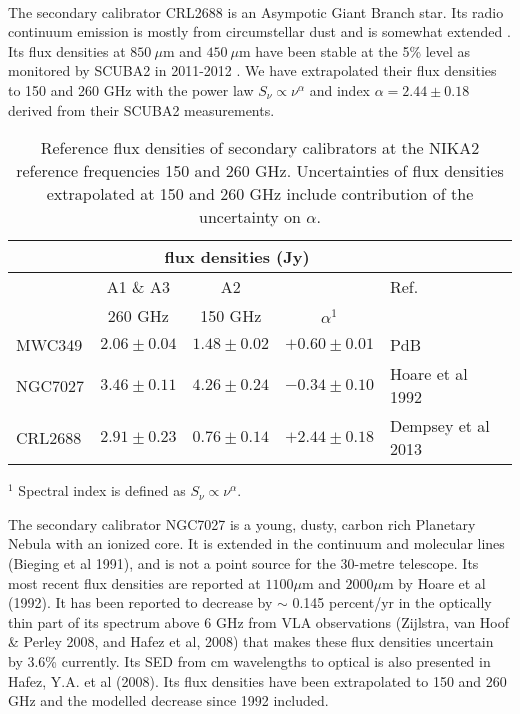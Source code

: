 \\

The secondary calibrator CRL2688 is an Asympotic Giant Branch star. Its radio continuum emission is mostly
from circumstellar dust and is somewhat extended \cite{Knapp}.
Its flux densities at $850\ \mu$m  and $450 \ \mu$m  have been stable at the 5\% level as monitored by SCUBA2 in 2011-2012 
\cite{Dempsey}. We have extrapolated their flux densities to  150 and 260 GHz
with the power law $S_{\nu} \propto \nu^{\alpha}$ and index $\alpha=2.44\pm0.18$ derived from their SCUBA2 measurements.

\begin{table}[t]
\begin{center}    
  \begin{threeparttable}

\begin{tabular}{|l|c|c|c|l|}
\hline
\multicolumn{1}{|c}{}  & \multicolumn{3}{|c}{flux  densities (Jy)} & \multicolumn{1}{|c|}{}  \\
\hline
         &    A1 \& A3       &  A2             &          &   Ref. \\
         &  260 GHz           &  150 GHz         & $\alpha^1$ &      \\
\hline
MWC349   &   $2.06\pm0.04$  &  $1.48\pm0.02$ &  $+0.60\pm0.01$      &  PdB \cite{krips}    \\
NGC7027  &   $3.46\pm0.11$   &  $4.26\pm0.24$  &  $-0.34\pm0.10$     &  Hoare et al 1992 \cite{Hoare}      \\
CRL2688  &   $2.91\pm0.23$   &  $0.76\pm0.14$  &  $+2.44\pm0.18$     &  Dempsey et al 2013  \cite{Dempsey} \\
\hline
\end{tabular}
  \begin{tablenotes}
{\small     
  \item[$^1$]  Spectral index is defined as $S_{\nu} \propto \nu^{\alpha}$. 
}
  \end{tablenotes}
\end{threeparttable}
\caption[]{Reference flux densities of secondary calibrators at the NIKA2 reference frequencies 150 and 260 GHz. Uncertainties of flux densities extrapolated
at 150 and 260 GHz include contribution of the uncertainty on $\alpha$.}
\label{tab:flux_ref_sec}
\end{center}
\end{table}

The secondary calibrator NGC7027 is a young, dusty, carbon rich Planetary Nebula with an ionized core.
It is extended in the continuum and molecular lines (Bieging et al 1991), and  is not a point source
for the 30-metre telescope.
Its  most recent flux densities are reported at $1100\mu$m  and $2000\mu$m by Hoare et al (1992). It has been reported
to decrease by $\sim$ 0.145 percent/yr in the optically thin part of its spectrum above  $6$ GHz from VLA
observations (Zijlstra, van Hoof \& Perley 2008, and Hafez et al, 2008) that makes these flux densities uncertain
by 3.6\% currently. Its SED from cm wavelengths to optical is also presented in Hafez, Y.A. et al (2008).
Its flux densities have been extrapolated to 150 and 260 GHz and the modelled decrease since 1992 included.

